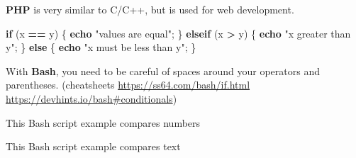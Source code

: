 \documentclass[
]{book}
\newenvironment{Shaded}{\begin{snugshade}}{\end{snugshade}}
\newcommand{\BuiltInTok}[1]{#1}
\newcommand{\ControlFlowTok}[1]{\textcolor[rgb]{0.13,0.29,0.53}{\textbf{#1}}}
\newcommand{\KeywordTok}[1]{\textcolor[rgb]{0.13,0.29,0.53}{\textbf{#1}}}
\newcommand{\NormalTok}[1]{#1}
\newcommand{\OperatorTok}[1]{\textcolor[rgb]{0.81,0.36,0.00}{\textbf{#1}}}
\newcommand{\OtherTok}[1]{\textcolor[rgb]{0.56,0.35,0.01}{#1}}
\newcommand{\StringTok}[1]{\textcolor[rgb]{0.31,0.60,0.02}{#1}}
\newcommand{\VariableTok}[1]{\textcolor[rgb]{0.00,0.00,0.00}{#1}}
\begin{document}
\textbf{PHP} is very similar to C/C++, but is used for web development.

\begin{Shaded}
\begin{Highlighting}[]
\ControlFlowTok{if}\NormalTok{ (x }\OperatorTok{==}\NormalTok{ y) \{}
  \KeywordTok{echo} \StringTok{"values are equal"}\OtherTok{;}
\NormalTok{\} }\ControlFlowTok{elseif}\NormalTok{ (x }\OperatorTok{\textgreater{}}\NormalTok{ y) \{}
  \KeywordTok{echo} \StringTok{"x greater than y"}\OtherTok{;}
\NormalTok{\} }\ControlFlowTok{else}\NormalTok{ \{}
  \KeywordTok{echo} \StringTok{"x must be less than y"}\OtherTok{;}
\NormalTok{\}}
\end{Highlighting}
\end{Shaded}

With \textbf{Bash}, you need to be careful of spaces around your operators and parentheses. (cheatsheets \url{https://ss64.com/bash/if.html} \url{https://devhints.io/bash\#conditionals})

This Bash script example compares numbers

\begin{Shaded}
\end{Shaded}

This Bash script example compares text

\begin{Shaded}
\end{Shaded}
\end{document}
